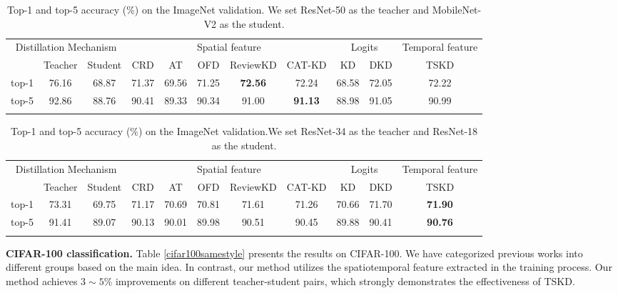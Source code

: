 \documentclass[letterpaper]{article} %
\begin{document}
\begin{table}[t]
\centering
\begin{tabular}{@{}ccc|ccccc|cc|c@{}}

\multicolumn{3}{c|}{Distillation Mechanism} &\multicolumn{5}{c|}{Spatial feature} & \multicolumn{2}{c|}{Logits} &Temporal feature\\ \Xhline{1.5pt}
 & Teacher & Student & CRD    & AT     & OFD     & ReviewKD   & CAT-KD    & KD & DKD     & TSKD      \\ \hline
top-1   & 76.16   & 68.87  & 71.37 & 69.56  & 71.25  & \textbf{72.56}   & 72.24  & 68.58  & 72.05  & 72.22                \\
top-5   &92.86    & 88.76  & 90.41      &89.33        & 90.34       & 91.00       & \textbf{91.13}               &88.98     &91.05    &90.99  \\ 
\hspace*{\fill} \\
\end{tabular}
\caption{Top-1 and top-5 accuracy (\%) on the ImageNet validation. We set ResNet-50 as the teacher and MobileNet-V2 as the student.}
\label{R50tomobile}
\end{table}
\begin{table}[t]
\centering
\begin{tabular}{@{}ccc|ccccc|cc|c@{}}
\multicolumn{3}{c|}{Distillation Mechanism} &\multicolumn{5}{c|}{Spatial feature} & \multicolumn{2}{c|}{Logits} &Temporal feature\\ \Xhline{1.5pt}
 & Teacher & Student & CRD    & AT     & OFD     & ReviewKD   & CAT-KD    & KD & DKD     & TSKD        \\ \hline
top-1   & 73.31   & 69.75   & 71.17 & 70.69 & 70.81 & 71.61 & 71.26   & 70.66  & 71.70 & \textbf{71.90} \\
top-5   & 91.41   & 89.07   & 90.13      &90.01       &89.98       &90.51      & 90.45              &89.88   &90.41   & \textbf{90.76 }             \\ 
 \\
\end{tabular}
\caption{Top-1 and top-5 accuracy (\%) on the ImageNet validation.We set ResNet-34 as the teacher and ResNet-18 as the student.}
\label{r34tor18}
\end{table}



\noindent\textbf{CIFAR-100 classification.} Table \ref{cifar100samestyle} presents the results on CIFAR-100. We have categorized previous works into different groups based on the main idea. In contrast, our method utilizes the spatiotemporal feature extracted in the training process. Our method achieves $3 \sim 5\%$ improvements on different teacher-student pairs, which strongly demonstrates the effectiveness of TSKD.
\end{document}
